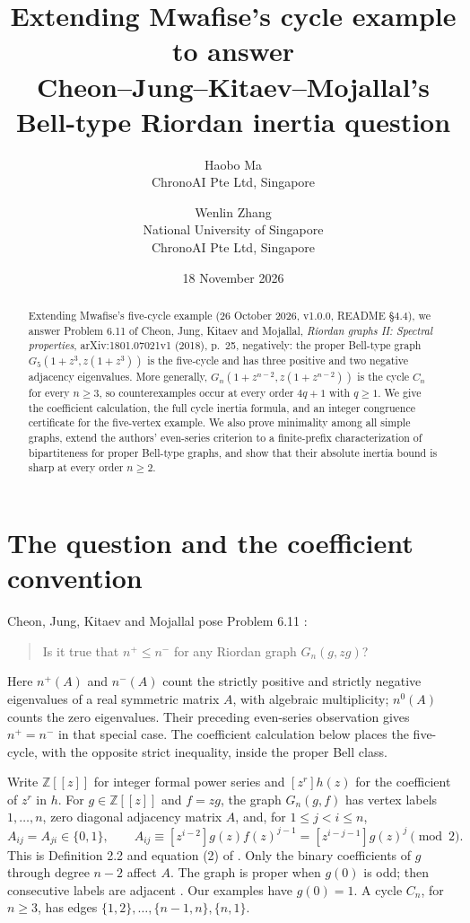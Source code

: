\documentclass[11pt]{article}
\title{Extending Mwafise's cycle example to answer\protect\\
Cheon--Jung--Kitaev--Mojallal's\protect\\
Bell-type Riordan inertia question}
\author{Haobo Ma\\\small ChronoAI Pte Ltd, Singapore
\and Wenlin Zhang\\\small National University of Singapore\\
\small ChronoAI Pte Ltd, Singapore}
\date{18 November 2026}
\newcommand{\Z}{\mathbb Z}
\newcommand{\np}{n^+}
\newcommand{\nm}{n^-}
\begin{document}
\maketitle
\begin{abstract}
Extending Mwafise's five-cycle example (26 October 2026,
v1.0.0, README \S4.4), we answer Problem 6.11 of
Cheon, Jung, Kitaev and Mojallal,
\emph{Riordan graphs II: Spectral properties}, arXiv:1801.07021v1
(2018), p.~25, negatively: the proper Bell-type graph
$G_5(1+z^3,z(1+z^3))$ is the five-cycle and has three positive and two
negative adjacency eigenvalues. More generally, $G_n(1+z^{n-2},z(1+z^{n-2}))$
is the cycle $C_n$ for every $n\geq3$, so counterexamples occur at every
order $4q+1$ with $q\geq1$. We give the coefficient calculation, the full
cycle inertia formula, and an integer congruence certificate for the
five-vertex example. We also prove minimality among all simple graphs,
extend the authors' even-series criterion to a finite-prefix
characterization of bipartiteness for proper Bell-type graphs, and show
that their absolute inertia bound is sharp at every order $n\geq2$.
\end{abstract}

\section{The question and the coefficient convention}
Cheon, Jung, Kitaev and Mojallal pose Problem 6.11
\cite[p.~25]{CJKM}:
\begin{quote}
Is it true that $n^+\leq n^-$ for any Riordan graph $G_n(g,zg)$?
\end{quote}
Here $\np(A)$ and $\nm(A)$ count the strictly positive and strictly negative
eigenvalues of a real symmetric matrix $A$, with algebraic multiplicity;
$n^0(A)$ counts the zero eigenvalues.
Their preceding even-series observation gives $\np=\nm$ in that
special case. The coefficient calculation below places the five-cycle,
with the opposite strict inequality, inside the proper Bell class.

Write $\Z[[z]]$ for integer formal power series and $[z^r]h(z)$ for
the coefficient of $z^r$ in $h$. For $g\in\Z[[z]]$ and $f=zg$, the
graph $G_n(g,f)$ has vertex labels $1,\ldots,n$, zero diagonal adjacency
matrix $A$, and, for $1\leq j<i\leq n$,
\begin{equation}\label{eq:coefficient}
 A_{ij}=A_{ji}\in\{0,1\},\qquad
 A_{ij}\equiv[z^{i-2}]g(z)f(z)^{j-1}
 =[z^{i-j-1}]g(z)^j\pmod2.
\end{equation}
This is Definition 2.2 and equation (2) of \cite[p.~3]{CJKM}.
Only the binary coefficients of $g$ through degree $n-2$ affect $A$.
The graph is proper when $g(0)$ is odd; then consecutive labels are
adjacent \cite[Definition 2.3, p.~4]{CJKM}. Our examples have $g(0)=1$.
A cycle $C_n$, for $n\geq3$, has edges
$\{1,2\},\ldots,\{n-1,n\},\{n,1\}$.
\end{document}
